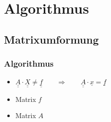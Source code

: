 \section{Algorithmus}

\newcommand{\dunderline}[1]{\underline{\underline{#1}}}
\subsection{Matrixumformung}
\begin{frame}
\frametitle{Algorithmus} 
	\begin{itemize}[<+->]
		\item $\dunderline{A}\cdot \dunderline{X} \ne \dunderline{f} \qquad\Rightarrow\qquad \dunderline{A}\cdot \underline{x} = \underline{f}$
		\item Matrix $f$
		\item Matrix $A$
	\end{itemize}

\end{frame}
